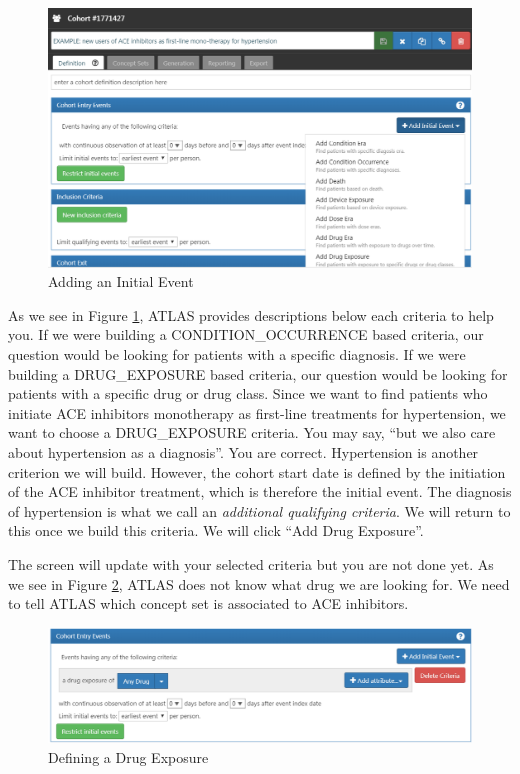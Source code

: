 \documentclass[11pt]{book}
\theoremstyle{definition}
\theoremstyle{definition}
\theoremstyle{definition}
\theoremstyle{remark}
\begin{document}
\begin{figure}

{\centering \includegraphics[width=1\linewidth]{images/Cohorts/ATLAS-initialevent} 

}

\caption{Adding an Initial Event}\label{fig:ATLASinitialevent}
\end{figure}

As we see in Figure \ref{fig:ATLASinitialevent}, ATLAS provides descriptions below each criteria to help you. If we were building a CONDITION\_OCCURRENCE based criteria, our question would be looking for patients with a specific diagnosis. If we were building a DRUG\_EXPOSURE based criteria, our question would be looking for patients with a specific drug or drug class. Since we want to find patients who initiate ACE inhibitors monotherapy as first-line treatments for hypertension, we want to choose a DRUG\_EXPOSURE criteria. You may say, ``but we also care about hypertension as a diagnosis''. You are correct. Hypertension is another criterion we will build. However, the cohort start date is defined by the initiation of the ACE inhibitor treatment, which is therefore the initial event. The diagnosis of hypertension is what we call an \emph{additional qualifying criteria}. We will return to this once we build this criteria. We will click ``Add Drug Exposure''.

The screen will update with your selected criteria but you are not done yet. As we see in Figure \ref{fig:ATLASdrugexposure}, ATLAS does not know what drug we are looking for. We need to tell ATLAS which concept set is associated to ACE inhibitors.

\begin{figure}

{\centering \includegraphics[width=1\linewidth]{images/Cohorts/ATLAS-drugexposure} 

}

\caption{Defining a Drug Exposure}\label{fig:ATLASdrugexposure}
\end{figure}
\end{document}
